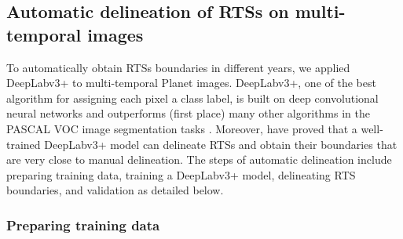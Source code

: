 \documentclass[authoryear,preprint,review,12pt]{elsarticle}
\begin{document}
\subsection{Automatic delineation of RTSs on multi-temporal images}
\label{sec_auto_delineating}

To automatically obtain RTSs boundaries in different years, we applied DeepLabv3+ to multi-temporal Planet images. 
DeepLabv3+, one of the best algorithm for assigning each pixel a class label, is built on deep convolutional neural networks \citep{chen2018encoder-decoder} and outperforms (first place) many other algorithms in the PASCAL VOC image segmentation tasks \citep{everingham2015The}.
Moreover, \cite{huang2020using} have proved that a well-trained DeepLabv3+ model can delineate RTSs and obtain their boundaries that are very close to manual delineation.
The steps of automatic delineation include preparing training data, training a DeepLabv3+ model, delineating RTS boundaries, and validation as detailed below. 


\subsubsection{Preparing training data}
\label{sec_prepare_training}


\end{document}
